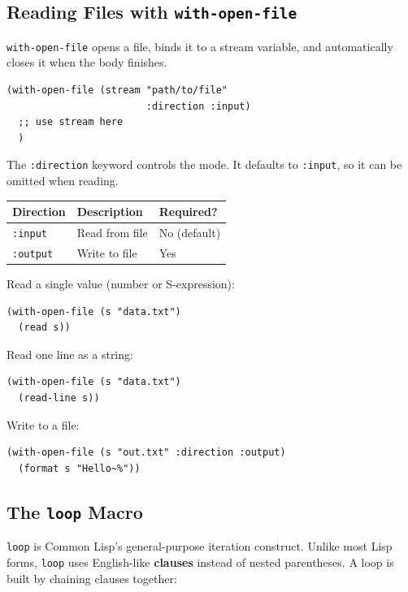 \subsection{Reading Files with \texttt{with-open-file}}

\texttt{with-open-file} opens a file, binds it to a stream variable,
and automatically closes it when the body finishes.

\begin{lstlisting}
(with-open-file (stream "path/to/file"
                        :direction :input)
  ;; use stream here
  )
\end{lstlisting}

The \texttt{:direction} keyword controls the mode.
It defaults to \texttt{:input}, so it can be omitted when reading.

\begin{center}
\begin{tabular}{lll}
  \toprule
  \textbf{Direction} & \textbf{Description} & \textbf{Required?} \\
  \midrule
  \texttt{:input}  & Read from file & No (default) \\
  \texttt{:output} & Write to file  & Yes \\
  \bottomrule
\end{tabular}
\end{center}

Read a single value (number or S-expression):

\begin{lstlisting}
(with-open-file (s "data.txt")
  (read s))
\end{lstlisting}

Read one line as a string:

\begin{lstlisting}
(with-open-file (s "data.txt")
  (read-line s))
\end{lstlisting}

Write to a file:

\begin{lstlisting}
(with-open-file (s "out.txt" :direction :output)
  (format s "Hello~%"))
\end{lstlisting}

\subsection{The \texttt{loop} Macro}

\texttt{loop} is Common Lisp's general-purpose iteration construct.
Unlike most Lisp forms, \texttt{loop} uses English-like \textbf{clauses}
instead of nested parentheses. A loop is built by chaining clauses together:

